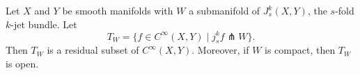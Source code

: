 Let $X$ and $Y$ be smooth manifolds with $W$ a submanifold of $J_s^k(X, Y)$, the $s$-fold $k$-jet bundle. Let
$$T_W = \{f \in C^\infty(X, Y) \mid j_s^k f \pitchfork W\}.$$
Then $T_W$ is a residual subset of $C^\infty(X, Y)$. Moreover, if $W$ is compact, then $T_W$ is open.